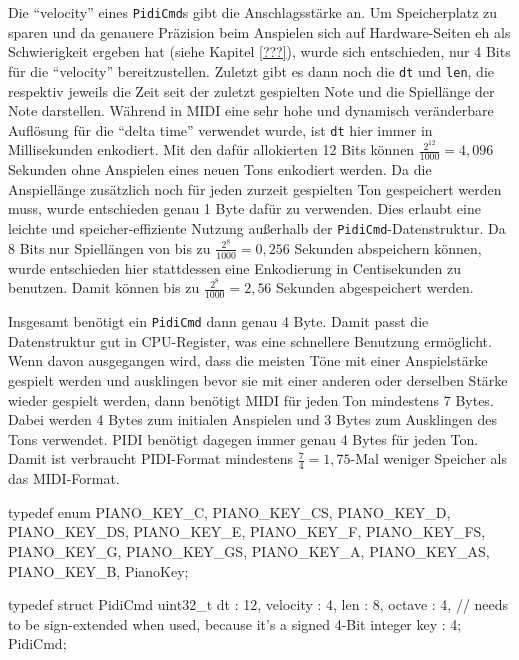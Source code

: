 Die \enquote{velocity} eines \lstinline{PidiCmd}s gibt die Anschlagsstärke an.
Um Speicherplatz zu sparen und da genauere Präzision beim Anspielen sich auf Hardware-Seiten eh als Schwierigkeit ergeben hat (siehe Kapitel \ref{???}), wurde sich entschieden, nur 4 Bits für die \enquote{velocity} bereitzustellen.
Zuletzt gibt es dann noch die \lstinline{dt} und \lstinline{len}, die respektiv jeweils die Zeit seit der zuletzt gespielten Note und die Spiellänge der Note darstellen.
Während in \ac{MIDI} eine sehr hohe und dynamisch veränderbare Auflösung für die \enquote{delta time} verwendet wurde, ist \lstinline{dt} hier immer in Millisekunden enkodiert.
Mit den dafür allokierten 12 Bits können $\frac{2^{12}}{1000} = 4,096$ Sekunden ohne Anspielen eines neuen Tons enkodiert werden.
Da die Anspiellänge zusätzlich noch für jeden zurzeit gespielten Ton gespeichert werden muss, wurde entschieden genau 1 Byte dafür zu verwenden.
Dies erlaubt eine leichte und speicher-effiziente Nutzung außerhalb der \lstinline{PidiCmd}-Datenstruktur.
Da 8 Bits nur Spiellängen von bis zu $\frac{2^8}{1000} = 0,256$ Sekunden abspeichern können, wurde entschieden hier stattdessen eine Enkodierung in Centisekunden zu benutzen.
Damit können bis zu $\frac{2^8}{1000} = 2,56$ Sekunden abgespeichert werden.

Insgesamt benötigt ein \lstinline{PidiCmd} dann genau 4 Byte.
Damit passt die Datenstruktur gut in CPU-Register, was eine schnellere Benutzung ermöglicht.
Wenn davon ausgegangen wird, dass die meisten Töne mit einer Anspielstärke gespielt werden und ausklingen bevor sie mit einer anderen oder derselben Stärke wieder gespielt werden, dann benötigt \ac{MIDI} für jeden Ton mindestens 7 Bytes.
Dabei werden 4 Bytes zum initialen Anspielen und 3 Bytes zum Ausklingen des Tons verwendet.
\ac{PIDI} benötigt dagegen immer genau 4 Bytes für jeden Ton.
Damit ist verbraucht \ac{PIDI}-Format mindestens $\frac{7}{4} = 1,75$-Mal weniger Speicher als das \ac{MIDI}-Format.

\begin{UnbrokenCodePage}[style=CStyle, caption={Definition eines \ac{PIDI}-Kommands}, label={code:PidiCmd struct}]
typedef enum {
    PIANO_KEY_C,
    PIANO_KEY_CS,
    PIANO_KEY_D,
    PIANO_KEY_DS,
    PIANO_KEY_E,
    PIANO_KEY_F,
    PIANO_KEY_FS,
    PIANO_KEY_G,
    PIANO_KEY_GS,
    PIANO_KEY_A,
    PIANO_KEY_AS,
    PIANO_KEY_B,
} PianoKey;

typedef struct PidiCmd {
    uint32_t dt : 12,
    velocity    : 4,
    len         : 8,
    octave      : 4, // needs to be sign-extended when used, because it's a signed 4-Bit integer
    key         : 4;
} PidiCmd;
\end{UnbrokenCodePage}


